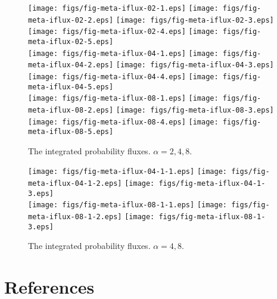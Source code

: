 \documentclass[aip,jcp,a4paper,reprint,onecolumn]{revtex4-1}
\begin{document}
\begin{figure}
  \centering
  \texttt{[image: figs/fig-meta-iflux-02-1.eps]}
  \texttt{[image: figs/fig-meta-iflux-02-2.eps]}
  \texttt{[image: figs/fig-meta-iflux-02-3.eps]}
  \texttt{[image: figs/fig-meta-iflux-02-4.eps]}
  \texttt{[image: figs/fig-meta-iflux-02-5.eps]}\\
  \texttt{[image: figs/fig-meta-iflux-04-1.eps]}
  \texttt{[image: figs/fig-meta-iflux-04-2.eps]}
  \texttt{[image: figs/fig-meta-iflux-04-3.eps]}
  \texttt{[image: figs/fig-meta-iflux-04-4.eps]}
  \texttt{[image: figs/fig-meta-iflux-04-5.eps]}\\
  \texttt{[image: figs/fig-meta-iflux-08-1.eps]}
  \texttt{[image: figs/fig-meta-iflux-08-2.eps]}
  \texttt{[image: figs/fig-meta-iflux-08-3.eps]}
  \texttt{[image: figs/fig-meta-iflux-08-4.eps]}
  \texttt{[image: figs/fig-meta-iflux-08-5.eps]}\\
  \caption{The integrated probability fluxes. $\alpha = 2,4,8$.}
  \label{fig:tmp3}
\end{figure}

\begin{figure}
  \centering
  \texttt{[image: figs/fig-meta-iflux-04-1-1.eps]}
  \texttt{[image: figs/fig-meta-iflux-04-1-2.eps]}
  \texttt{[image: figs/fig-meta-iflux-04-1-3.eps]}\\
  \texttt{[image: figs/fig-meta-iflux-08-1-1.eps]}
  \texttt{[image: figs/fig-meta-iflux-08-1-2.eps]}
  \texttt{[image: figs/fig-meta-iflux-08-1-3.eps]}
  \caption{The integrated probability fluxes. $\alpha = 4,8$.}
  \label{fig:tmp3}
\end{figure}



\section*{References}
{}

\end{document}
